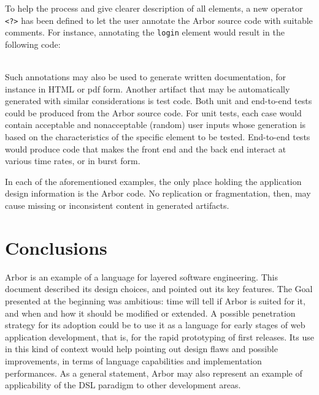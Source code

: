 \documentclass[12pt]{article} %
\newcommand{\be}{back end}
\newcommand{\fe}{front end}
\newcommand{\DSL}{DSL}
\newcommand{\A}{Arbor}
\newcommand{\myverb}[1]{\texttt{\footnotesize #1}}
\begin{document}
To help the process and give clearer description of all elements, a new operator \myverb{<?>} has been defined to let the user annotate the \A{} source code with suitable comments. For instance, annotating the \myverb{login} element would result in the following code:\\

~\\
Such annotations may also be used to generate written documentation, for instance in HTML or pdf form. 
Another artifact that may be automatically generated with similar considerations is test code. Both unit and end-to-end tests could be produced from the \A{} source code. For unit tests, each case would contain acceptable and nonacceptable (random) user inputs whose generation is based on the characteristics of the specific element to be tested. End-to-end tests would produce code that makes the \fe{} and the \be{} interact at various time rates, or in burst form. 

In each of the aforementioned examples, the only place holding the application design information is the \A{} code. No replication or fragmentation, then, may cause missing or inconsistent content in generated artifacts.
\section{Conclusions}
\A{} is an example of a language for layered software engineering. This document described its design choices, and pointed out its key features. The Goal presented at the beginning was ambitious: time will tell if \A{} is suited for it, and when and how it should be modified or extended. A possible penetration strategy for its adoption could be to use it as a language for early stages of web application development, that is, for the rapid prototyping of first releases. Its use in this kind of context would help pointing out design flaws and possible improvements, in terms of language capabilities and implementation performances. As a general statement, \A{} may also represent an example of applicability of the \DSL{} paradigm to other development areas.
\newpage
\end{document}
